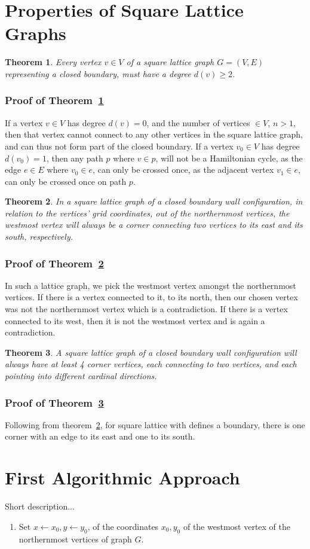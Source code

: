\documentclass[a4paper,12pt]{article}
\newtheorem{theorem}{Theorem}
\begin{document}
\section{Properties of Square Lattice Graphs}
\begin{theorem}
Every vertex $v\in V$ of a square lattice graph $G=(V,E)$ representing a closed boundary, must have a degree $d(v)\geq 2$.\label{DegreeLemma}
\end{theorem}
\subsubsection*{Proof of Theorem~\ref{DegreeLemma}}
If a vertex $v\in V$ has degree $d(v)=0$, and the number of vertices $\in V$, $n>1$, then that vertex cannot connect to any other vertices in the square lattice graph, and can thus not form part of the closed boundary. If a vertex $v_0\in V$ has degree $d(v_0)=1$, then any path $p$ where $v\in p$, will not be a Hamiltonian cycle, as the edge $e\in E$ where $v_0\in e$, can only be crossed once, as the adjacent vertex $v_1\in e$, can only be crossed once on path $p$.
\begin{theorem}
In a square lattice graph of a closed boundary wall configuration, in relation to the vertices' grid coordinates, out of the northernmost vertices, the westmost vertex will always be a corner connecting two vertices to its east and its south, respectively.\label{NorthwestCornerLemma}
\end{theorem}
\subsubsection*{Proof of Theorem~\ref{NorthwestCornerLemma}}
In such a lattice graph, we pick the westmost vertex amongst the northernmost vertices. If there is a vertex connected to it, to its north, then our chosen vertex was not the northernmost vertex which is a contradiction. If there is a vertex connected to its west, then it is not the westmost vertex and is again a contradiction. 
\begin{theorem}
A square lattice graph of a closed boundary wall configuration will always have at least 4 corner vertices, each connecting to two vertices, and each pointing into different cardinal directions.\label{FourCornerLemma}
\end{theorem}
\subsubsection*{Proof of Theorem~\ref{FourCornerLemma}}
Following from theorem~\ref{NorthwestCornerLemma}, for square lattice with defines a boundary, there is one corner with an edge to its east and one to its south. 
\section{First Algorithmic Approach}
Short description...
\begin{enumerate}[1.]
\item Set $x\gets x_0, y\gets y_0$, of the coordinates $x_0,y_0$ of the westmost vertex of the northernmost vertices of graph $G$.
\end{enumerate}
\pagebreak
\nocite{*}
\printbibliography
\end{document}
